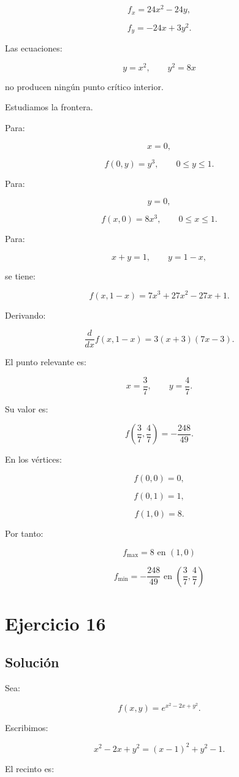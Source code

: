 \documentclass[11pt,a4paper]{article}
\begin{document}
\[
f_x=24x^2-24y,
\]

\[
f_y=-24x+3y^2.
\]

Las ecuaciones:

\[
y=x^2,
\qquad
y^2=8x
\]

no producen ningún punto crítico interior.

Estudiamos la frontera.

Para:

\[
x=0,
\]

\[
f(0,y)=y^3,
\qquad
0\leq y\leq1.
\]

Para:

\[
y=0,
\]

\[
f(x,0)=8x^3,
\qquad
0\leq x\leq1.
\]

Para:

\[
x+y=1,
\qquad
y=1-x,
\]

se tiene:

\[
f(x,1-x)
=
7x^3+27x^2-27x+1.
\]

Derivando:

\[
\frac{d}{dx}f(x,1-x)
=
3(x+3)(7x-3).
\]

El punto relevante es:

\[
x=\frac37,
\qquad
y=\frac47.
\]

Su valor es:

\[
f\left(
\frac37,\frac47
\right)
=
-\frac{248}{49}.
\]

En los vértices:

\[
f(0,0)=0,
\]

\[
f(0,1)=1,
\]

\[
f(1,0)=8.
\]

Por tanto:

\[
\boxed{
f_{\max}=8
\text{ en }(1,0)
}
\]

\[
\boxed{
f_{\min}
=
-\frac{248}{49}
\text{ en }
\left(
\frac37,\frac47
\right)
}
\]

\section{Ejercicio 16}
\subsection{Solución}

Sea:

\[
f(x,y)
=
e^{x^2-2x+y^2}.
\]

Escribimos:

\[
x^2-2x+y^2
=
(x-1)^2+y^2-1.
\]

El recinto es:
\end{document}
